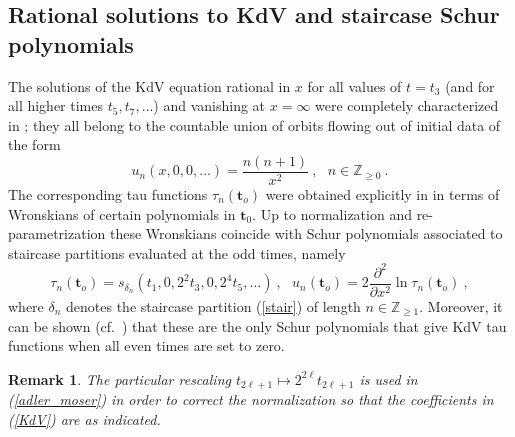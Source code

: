 \documentclass[10pt,reqno,oneside]{amsart}
\numberwithin{equation}{section}
\newtheorem{theo}{Theorem}[section]
\newtheorem{remark}[theo]{Remark}
\def\bt{\begin{theo}}
\def\br{\begin{remark}}
\def\er{\end{remark}}
\def\be{\begin{equation}}
\def\ee{\end{equation}}
\def \pa{\partial}
\def\eqref#1{(\ref{#1})}
\def\bt{{\mathbf t}}
\begin{document}
\subsection{Rational solutions to KdV and staircase Schur polynomials} The solutions of the KdV equation rational in $x$ for all values of $t=t_3$ (and for all higher times $t_5, t_7,\dots$) and vanishing at $x=\infty$ were completely characterized in \cite{AMM}; they all belong to the countable union of orbits flowing out of initial data of the form 
\be
u_n(x,0,0,\dots)= \frac{n(n+1)}{x^2}\ ,\ \ \ n\in \mathbb{Z}_{\geq 0}\ .
\ee
The corresponding tau functions $\tau_n(\bt_o)$ were obtained explicitly in \cite{AM} in terms of Wronskians of certain polynomials in $\bt_0$. Up to normalization and re-parametrization these Wronskians coincide with Schur polynomials associated to staircase partitions evaluated at the odd times, namely
\be
\label{adler_moser}
\tau_n(\bt_o) = s_{\delta_n}(t_1,0,2^2t_3,0,2^4 t_5,\dots)\ ,\ \ \ u_n(\bt_o) = 2 \frac {\pa^2} {\pa x^2} \ln \tau_n(\bt_o)\ ,
\ee
where $\delta_n$ denotes the staircase partition \eqref{stair} of length $n\in\mathbb{Z}_{\geq 1}$.  Moreover, it can be shown (cf.~\cite{SW}) that these are the only Schur polynomials
that give KdV tau functions when all even times are set to zero.
\br
The particular rescaling $t_{2\ell+1}\mapsto 2^{2\ell}t_{2\ell+1}$ is used in \eqref{adler_moser} in order to correct the normalization so that the coefficients in \eqref{KdV} are as indicated.
\er
\end{document}
